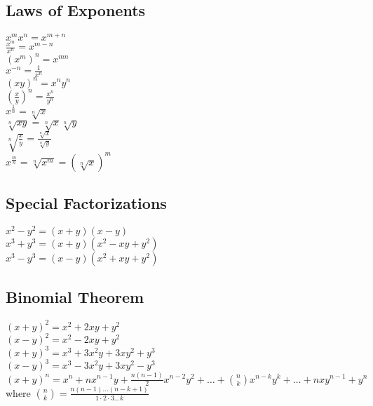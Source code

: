 \documentclass{article}
\begin{document}
	\subsection*{Laws of Exponents}
		\begin{center}
		$x^m x^n = x^{m+n}$\\
		
		$\frac{x^m}{x^n} = x^{m-n}$\\
		
		$(x^m)^n = x^{mn}$\\
		
		$x^{-n} = \frac{1}{x^n}$\\
		
		$(xy)^n = x^n y^n$\\
		
		$(\frac{x}{y})^n = \frac{x^n}{y^n}$\\
		
		$x^{\frac{1}{n}} = \sqrt[n]{x}$\\
		
		$\sqrt[n]{xy} = \sqrt[n]{x}\sqrt[n]{y}$\\
		
		$\sqrt[n]{\frac{x}{y}} = \frac{\sqrt[n]{x}}{\sqrt[n]{y}}$\\
		
		$x^{\frac{m}{n}} = \sqrt[n]{x^m} = (\sqrt[n]{x})^m$
		\end{center}
	\subsection*{Special Factorizations}
		\begin{center}
		$x^2 - y^2 = (x + y)(x - y)$\\
		$x^3 + y^3 = (x + y)(x^2 - xy + y^2)$\\
		$x^3 - y^3 = (x-y)(x^2 + xy + y^2)$
		\end{center}
	\subsection*{Binomial Theorem}
		\begin{center}
		$(x+y)^2 = x^2 + 2xy +y^2$\\
		$(x-y)^2 = x^2 - 2xy + y^2$\\
		$(x+y)^3 = x^3 + 3x^2y + 3xy^2 + y^3$\\
		$(x-y)^3 = x^3 - 3x^2y + 3xy^2 - y^3$
		$(x+y)^n = x^n + nx^{n-1}y + \frac{n(n-1)}{2}x^{n-2}y^2 + \ldots + \binom{n}{k}x^{n-k}y^k + \ldots + nxy^{n-1} + y^n$\\
		where $\binom{n}{k} = \frac{n(n-1)\ldots(n-k+1)}{1 \cdot 2 \cdot 3 \ldots k}$
		\end{center}
\end{document}
